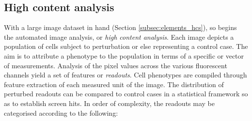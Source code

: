 %
%
%
%
%

\subsection{High content analysis}
\label{subsec:HCA}

With a large image dataset in hand (Section \ref{subsec:elements_hcs}), so begins the automated image analysis, or \emph{high content analysis}. Each image depicts a population of cells subject to perturbation or else representing a control case. The aim is to attribute a phenotype to the population in terms of a specific or vector of measurements. Analysis of the pixel values across the various fluorescent channels yield a set of features or \emph{readouts}. Cell phenotypes are compiled through feature extraction of each measured unit of the image. The distribution of perturbed readouts can be compared to control cases in a statistical framework so as to establish screen hits. In order of complexity, the readouts may be categorised according to the following:
%

